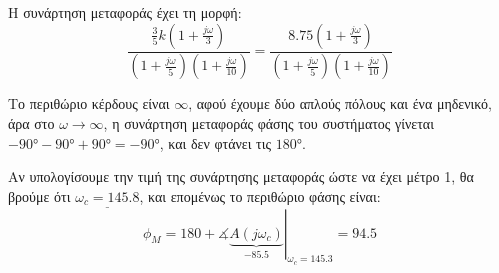 \documentclass[11pt,a4paper,notitlepage,fleqn,final]{article}
\begin{document}
\begin{exercise}[Παράδειγμα]
\tcbsubtitle{}
Η συνάρτηση μεταφοράς έχει τη μορφή:
\[
\frac{\frac{3}{5}k \left(1+\frac{j\omega }{3}\right)  }{\left( 1+\frac{j\omega }{5} \right)
	\left(1+\frac{j\omega }{10}\right)}
= \frac{8.75 \left(1+\frac{j\omega }{3}\right)  }{\left( 1+\frac{j\omega }{5} \right)
	\left(1+\frac{j\omega }{10}\right)}
\]

Το περιθώριο κέρδους είναι \( \infty \), αφού έχουμε δύο απλούς πόλους και ένα μηδενικό,
άρα στο \( \omega\to \infty \), η συνάρτηση μεταφοράς φάσης του συστήματος γίνεται
\( -\ang{90}-\ang{90}+\ang{90} = \ang{-90} \), και δεν φτάνει τις \( \ang{180} \).

Αν υπολογίσουμε την τιμή της συνάρτησης μεταφοράς ώστε να έχει μέτρο 1, θα βρούμε ότι
\( \underline{\omega_c = 145.8} \), και επομένως το περιθώριο φάσης είναι:
\[
\phi_M = \left. 180 + \measuredangle \underbrace{A(j\omega_c)}_{-85.5}
\right|_{\omega_c=145.3} = 94.5
\]

\end{exercise}
\end{document}
